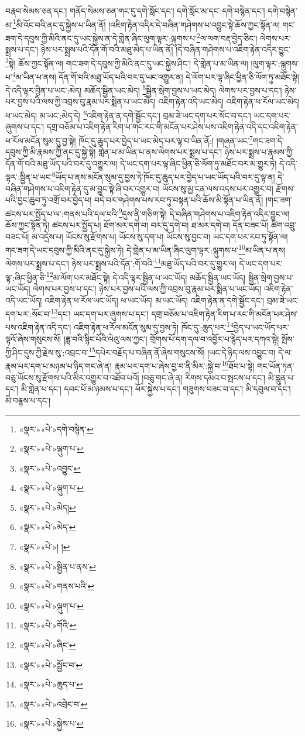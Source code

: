 བརྣབ་སེམས་ཅན་དང་། གནོད་སེམས་ཅན་གང་དུ་དགེ་སློང་དང་། དགེ་སློང་མ་དང་:དགེ་བསྙེན་དང་། དགེ་བསྙེན་མ་\footnote{«སྣར་»«པེ་»དགེ་བསྙེན་}མི་འོང་བའི་ནང་དུ་སྐྱེས་པ་ཡིན་ནོ། །འཇིག་རྟེན་འདིར་དེ་བཞིན་གཤེགས་པ་འབྱུང་སྟེ་ཆོས་ཀྱང་སྟོན་ལ། གང་ཟག་དེ་དབུས་ཀྱི་མིའི་ནང་དུ་ཡང་སྐྱེས་ན་དེ་གླེན་ཞིང་ལུག་ལྟར་:ལྐུགས་པ་\footnote{«སྣར་»«པེ་»ལྐུག་པ་}ལ་ལག་བརྡ་བྱེད་ཅིང་། ལེགས་པར་སྨྲས་པ་དང་། ཉེས་པར་སྨྲས་པའི་དོན་གོ་བའི་མཐུ་མེད་པ་ཡིན་ནོ། །དེ་བཞིན་གཤེགས་པ་འཇིག་རྟེན་འདིར་བྱུང་\footnote{«སྣར་»«པེ་»འབྱུང་}སྟེ། ཆོས་ཀྱང་སྟོན་ལ། གང་ཟག་དེ་དབུས་ཀྱི་མིའི་ནང་དུ་ཡང་སྐྱེས་ཤིང་། དེ་གླེན་པ་མ་ཡིན་ལ། །ལུག་ལྟར་:ལྐུགས་པ་\footnote{«སྣར་»«པེ་»ལྐུག་པ་}མ་ཡིན་པ་ནས། དོན་གོ་བའི་མཐུ་ཡོད་པའི་བར་དུ་ཡང་འགྱུར་ན། དེ་ལོག་པར་ལྟ་ཞིང་ཕྱིན་ཅི་ལོག་ཏུ་མཐོང་སྟེ། དེ་འདི་ལྟར་བྱིན་པ་ཡང་:མེད། མཆོད་སྦྱིན་ཡང་མེད། \footnote{«སྣར་»«པེ་»མེད།  }སྦྱིན་སྲེག་བྱས་པ་ཡང་མེད། ལེགས་པར་བྱས་པ་དང་། ཉེས་པར་བྱས་པའི་ལས་ཀྱི་འབྲས་བུ་རྣམ་པར་སྨིན་པ་ཡང་མེད། འཇིག་རྟེན་འདི་ཡང་མེད། འཇིག་རྟེན་ཕ་རོལ་ཡང་མེད། ཕ་ཡང་མེད། མ་ཡང་:མེད་དེ། \footnote{«སྣར་»«པེ་»མེད་}འཇིག་རྟེན་ན་དགེ་སྦྱོང་དང་། བྲམ་ཟེ་ཡང་དག་པར་སོང་བ་དང་། ཡང་དག་པར་ཞུགས་པ་དང་། དགྲ་བཅོམ་པ་འཇིག་རྟེན་རིག་པ་གང་རང་གི་མངོན་པར་ཤེས་པས་འཇིག་རྟེན་འདི་དང་འཇིག་རྟེན་ཕ་རོལ་མངོན་སུམ་དུ་བྱ་སྟེ། ཁོང་དུ་ཆུད་པར་བྱེད་པ་ཡང་མེད་པར་ལྟ་བ་ཡིན་ནོ:། །གཞན་ཡང་\footnote{«སྣར་»«པེ་»། །}གང་ཟག་དེ་དབུས་ཀྱི་མི་རྣམས་ཀྱི་ནང་དུ་སྐྱེ་སྟེ། གླེན་པ་མ་ཡིན་པ་ནས་ལེགས་པར་སྨྲས་པ་དང་། ཉེས་པར་སྨྲས་པ་རྣམས་ཀྱི་དོན་གོ་བའི་མཐུ་ཡོད་པའི་བར་དུ་འགྱུར་ལ། དེ་ཡང་དག་པར་ལྟ་ཞིང་ཕྱིན་ཅི་ལོག་ཏུ་མཐོང་བར་མ་གྱུར་ཏེ། དེ་འདི་ལྟར་:སྦྱིན་པ་ཡང་\footnote{«སྣར་»«པེ་»སྦྱིན་པ་ནས་}ཡོད་པ་ནས་མངོན་སུམ་དུ་བྱས་ཏེ་ཁོང་དུ་ཆུད་པར་བྱེད་པ་ཡང་ཡོད་པའི་བར་དུ་ལྟ་ན། དེ་བཞིན་གཤེགས་པ་འཇིག་རྟེན་དུ་མ་བྱུང་སྟེ་ཞི་བར་འགྱུར་བ། ཡོངས་སུ་མྱ་ངན་ལས་འདས་པར་འགྱུར་བ། རྫོགས་པའི་བྱང་ཆུབ་ཏུ་འགྲོ་བར་བྱེད་པ། བདེ་བར་གཤེགས་པས་རབ་ཏུ་བསྟན་པའི་ཆོས་མི་སྟོན་པ་ཡིན་ནོ། །གང་ཟག་ཚངས་པར་སྤྱོད་པ་ལ་:གནས་པའི་དལ་བའི་\footnote{«སྣར་»«པེ་»གནས་པའི་}དུས་ནི་གཅིག་སྟེ། དེ་བཞིན་གཤེགས་པ་འཇིག་རྟེན་འདིར་བྱུང་ལ། ཆོས་ཀྱང་སྟོན་ཏེ། ཚངས་པར་སྤྱོད་པ། ཐོག་མར་དགེ་བ། བར་དུ་དགེ་བ། ཐ་མར་དགེ་བ། དོན་བཟང་པོ། ཚིག་འབྲུ་བཟང་པོ། མ་འདྲེས་པ། ཡོངས་སུ་རྫོགས་པ། ཡོངས་སུ་དག་པ། ཡོངས་སུ་བྱང་བ། ཡང་དག་པར་རབ་ཏུ་སྟོན་ལ། གང་ཟག་དེ་ཡང་དབུས་ཀྱི་མིའི་ནང་དུ་སྐྱེས་ཏེ། དེ་གླེན་པ་མ་ཡིན་ཞིང་ལུག་ལྟར་:ལྐུགས་པ་\footnote{«སྣར་»«པེ་»ལྐུག་པ་}མ་ཡིན་པ་ནས། ལེགས་པར་སྨྲས་པ་དང་། ཉེས་པར་སྨྲས་པའི་དོན་:གོ་བའི་\footnote{«སྣར་»«པེ་»གོའི་}མཐུ་ཡོད་པའི་བར་དུ་གྱུར་ལ། དེ་ཡང་དག་པར་ལྟ་:ཞིང་ཕྱིན་ཅི་\footnote{«སྣར་»«པེ་»ཞིང་}མ་ལོག་པར་མཐོང་སྟེ། དེ་འདི་ལྟར་སྦྱིན་པ་ཡང་ཡོད། མཆོད་སྦྱིན་ཡང་ཡོད། སྦྱིན་སྲེག་བྱས་པ་ཡང་ཡོད། ལེགས་པར་བྱས་པ་དང་། ཉེས་པར་བྱས་པའི་ལས་ཀྱི་འབྲས་བུ་རྣམ་པར་སྨིན་པ་ཡང་ཡོད། འཇིག་རྟེན་འདི་ཡང་ཡོད། འཇིག་རྟེན་ཕ་རོལ་ཡང་ཡོད། ཕ་ཡང་ཡོད། མ་ཡང་ཡོད། འཇིག་རྟེན་ན་དགེ་སྦྱོང་དང་། བྲམ་ཟེ་ཡང་དག་པར་:སོང་བ་\footnote{«སྣར་»«པེ་»སྦྱོང་བ་}དང་། ཡང་དག་པར་ཞུགས་པ་དང་། དགྲ་བཅོམ་པ་འཇིག་རྟེན་རིག་པ་རང་གི་མངོན་པར་ཤེས་པས་འཇིག་རྟེན་འདི་དང་། འཇིག་རྟེན་ཕ་རོལ་མངོན་སུམ་དུ་བྱས་ཏེ། ཁོང་དུ་:ཆུད་པར་\footnote{«སྣར་»«པེ་»ཆུད་པ་}བྱེད་པ་ཡང་ཡོད་པར་ལྟའོ་ཞེས་གསུངས་སོ། །ཟླ་བའི་སྙིང་པོའི་ལེའུ་ལས་ཀྱང་། གྲོགས་པོ་དག་དལ་བ་འབྱོར་པ་རྙེད་པར་དཀའ་སྟེ། སྤོས་ཀྱི་ཤིང་དུས་ཀྱི་རྗེས་སུ་:འབྲང་བ་\footnote{«སྣར་»«པེ་»འབྲེང་བ་}དཔེར་བརྗོད་པ་བཞིན་ནོ་ཞེས་གསུངས་སོ། །ཡང་དེ་ཉིད་ལས་འབྱུང་བ། དེ་ལ་རྣམ་པར་དག་པ་མཉམ་པ་ཉིད་གང་ཞེ་ན། རྣམ་པར་དག་པ་ཞེས་བྱ་བ་ནི་མིར་:སྐྱེ་བ་\footnote{«སྣར་»«པེ་»སྐྱེས་པ་}ཐོབ་པ་སྟེ། གང་ཡོན་ཏན་བཅུ་ཡོངས་སུ་རྫོགས་པའི་མིར་འགྱུར་བ་འཐོབ་པའོ། །བཅུ་གང་ཞེ་ན། རིགས་དམའ་བ་སྤངས་པ་དང་། མི་བླུན་པ་དང་། མི་གླེན་པ་དང་། དབང་པོ་མ་ཉམས་པ་དང་། ཕོར་སྐྱེས་པ་དང་། གཟུགས་བཟང་བ་དང་། མི་དབུལ་བ་དང་། མི་བརྙས་པ་དང་། 